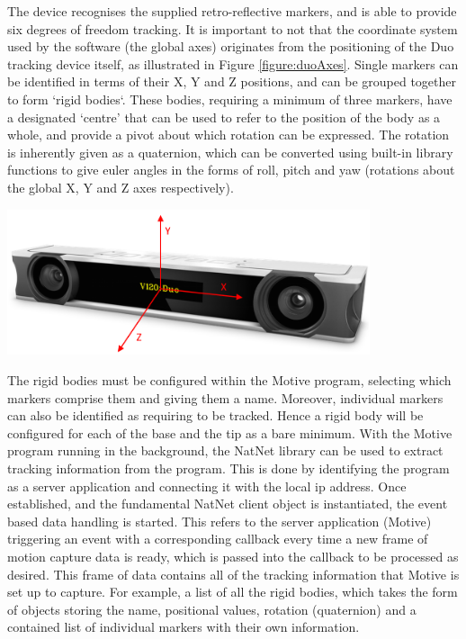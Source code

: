 \documentclass[11pt]{article}
\begin{document}
The device recognises the supplied retro-reflective markers, and is able to provide six degrees of freedom tracking. It is important to not that the coordinate system used by the software (the global axes) originates from the positioning of the Duo tracking device itself, as illustrated in Figure \ref{figure:duoAxes}. Single markers can be identified in terms of their X, Y and Z positions, and can be grouped together to form `rigid bodies`. These bodies, requiring a minimum of three markers, have a designated `centre' that can be used to refer to the position of the body as a whole, and provide a pivot about which rotation can be expressed. The rotation is inherently given as a quaternion, which can be converted using built-in library functions to give euler angles in the forms of roll, pitch and yaw (rotations about the global X, Y and Z axes respectively).


\begin{center}
\includegraphics[width=0.8\textwidth]{images/duoAxes.png}
\label{figure:duoAxes}
\end{center}

The rigid bodies must be configured within the Motive program, selecting which markers comprise them and giving them a name. Moreover, individual markers can also be identified as requiring to be tracked. Hence a rigid body will be configured for each of the base and the tip as a bare minimum. With the Motive program running in the background, the NatNet library can be used to extract tracking information from the program. This is done by identifying the program as a server application and connecting it with the local ip address. Once established, and the fundamental NatNet client object is instantiated, the event based data handling is started. This refers to the server application (Motive) triggering an event with a corresponding callback every time a new frame of motion capture data is ready, which is passed into the callback to be processed as desired. This frame of data contains all of the tracking information that Motive is set up to capture. For example, a list of all the rigid bodies, which takes the form of objects storing the name, positional values, rotation (quaternion) and a contained list of individual markers with their own information.
\end{document}
